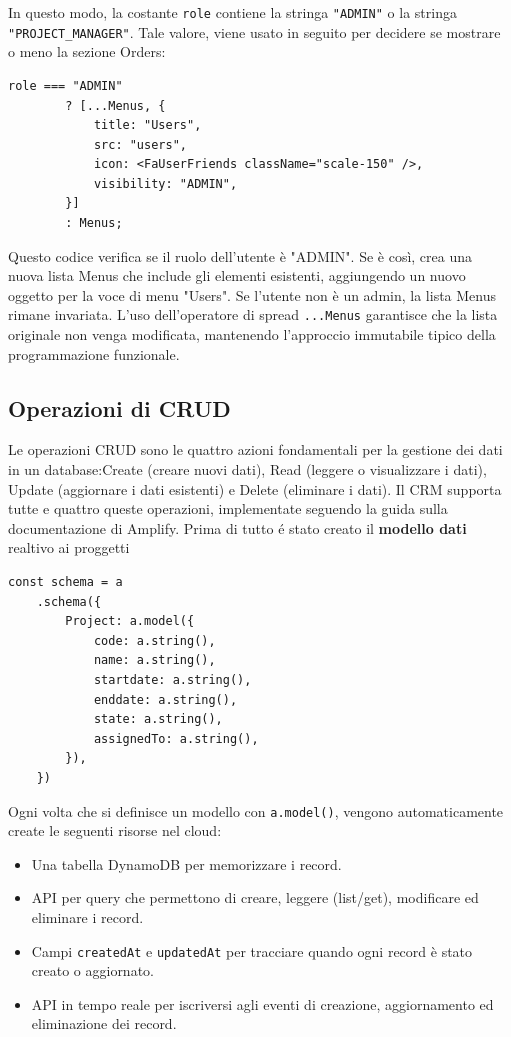 \documentclass[target=bach,aauheader=,style=]{thud}
\begin{document}
In questo modo, la costante \texttt{role} contiene la stringa \texttt{"ADMIN"} o la stringa  \texttt{"PROJECT\_MANAGER"}. Tale valore, viene usato in seguito per decidere se mostrare o meno la sezione Orders:

\begin{lstlisting}[caption=Verifica ruolo]
    role === "ADMIN" 
        ? [...Menus, {
            title: "Users",
            src: "users",
            icon: <FaUserFriends className="scale-150" />,
            visibility: "ADMIN",
        }]
        : Menus;
\end{lstlisting}

Questo codice verifica se il ruolo dell'utente è "ADMIN". Se è così, crea una nuova lista Menus che include gli elementi esistenti, aggiungendo un nuovo oggetto per la voce di menu "Users". Se l'utente non è un admin, la lista Menus rimane invariata. L'uso dell'operatore di spread \texttt{...Menus} garantisce che la lista originale non venga modificata, mantenendo l'approccio immutabile tipico della programmazione funzionale.

\subsection{Operazioni di CRUD}
Le operazioni CRUD sono le quattro azioni fondamentali per la gestione dei dati in un database:Create (creare nuovi dati), Read (leggere o visualizzare i dati), Update (aggiornare i dati esistenti) e Delete (eliminare i dati). Il CRM supporta tutte e quattro queste operazioni, implementate seguendo la guida \cite{awsamplifynextjs2024} sulla documentazione di Amplify. Prima di tutto é stato creato il \textbf{modello dati} realtivo ai proggetti

\begin{lstlisting}[caption=Parte del file \texttt{amplify/data/resource.ts}]
    const schema = a
    .schema({
        Project: a.model({
            code: a.string(),
            name: a.string(),
            startdate: a.string(),
            enddate: a.string(),
            state: a.string(),
            assignedTo: a.string(),
        }),
    })
\end{lstlisting}

Ogni volta che si definisce un modello con \texttt{a.model()}, vengono automaticamente create le seguenti risorse nel cloud:
\begin{itemize}
    \item Una tabella DynamoDB per memorizzare i record.
    \item API per query che permettono di creare, leggere (list/get), modificare ed eliminare i record.
    \item Campi \texttt{createdAt} e \texttt{updatedAt} per tracciare quando ogni record è stato creato o aggiornato.
    \item API in tempo reale per iscriversi agli eventi di creazione, aggiornamento ed eliminazione dei record.
\end{itemize}
\end{document}

